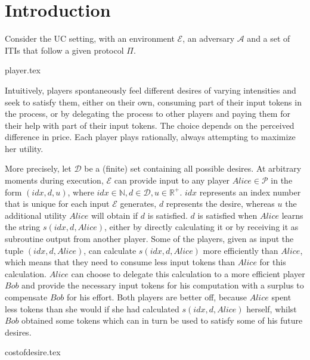 \section{Introduction}
  Consider the UC setting, with an environment $\mathcal{E}$, an adversary $\mathcal{A}$ and a set of ITIs that follow a
  given protocol $\Pi$.

  {player.tex}

  Intuitively, players spontaneously feel different desires of varying intensities and seek to satisfy them, either on their
  own, consuming part of their input tokens in the process, or by delegating the process to other players and paying them for
  their help with part of their input tokens. The choice depends on the perceived difference in price. Each player plays
  rationally, always attempting to maximize her utility.
  
  More precisely, let $\mathcal{D}$ be a (finite) set containing all possible desires. At arbitrary moments during execution,
  $\mathcal{E}$ can provide input to any player $Alice \in \mathcal{P}$ in the form $\left(idx, d, u\right)$, where $idx \in
  \mathbb{N}, d \in \mathcal{D}, u \in \mathbb{R}^{+}$. $idx$ represents an index number that is unique for each input
  $\mathcal{E}$ generates, $d$ represents the desire, whereas $u$ the additional utility $Alice$ will obtain if $d$ is
  satisfied. $d$ is satisfied when $Alice$ learns the string $s\left(idx, d, Alice\right)$, either by directly calculating it
  or by receiving it as subroutine output from another player. Some of the players, given as input the tuple $\left(idx, d,
  Alice\right)$, can calculate $s\left(idx, d, Alice\right)$ more efficiently than $Alice$, which means that they need to
  consume less input tokens than $Alice$ for this calculation. $Alice$ can choose to delegate this calculation to a more
  efficient player $Bob$ and provide the necessary input tokens for his computation with a surplus to compensate $Bob$ for his
  effort. Both players are better off, because $Alice$ spent less tokens than she would if she had calculated $s\left(idx, d,
  Alice\right)$ herself, whilst $Bob$ obtained some tokens which can in turn be used to satisfy some of his future desires.

  {costofdesire.tex}
